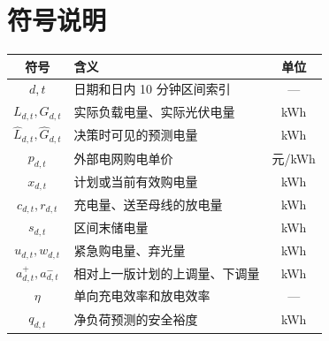 \section{符号说明}

\begin{center}
  \begin{tabular}{clc}
    \toprule
    \textbf{符号} & \textbf{含义} & \textbf{单位} \\
    \midrule
    $d,t$ & 日期和日内 10 分钟区间索引 & --- \\
    $L_{d,t},G_{d,t}$ & 实际负载电量、实际光伏电量 & kWh \\
    $\widehat L_{d,t},\widehat G_{d,t}$ & 决策时可见的预测电量 & kWh \\
    $p_{d,t}$ & 外部电网购电单价 & 元/kWh \\
    $x_{d,t}$ & 计划或当前有效购电量 & kWh \\
    $c_{d,t},r_{d,t}$ & 充电量、送至母线的放电量 & kWh \\
    $s_{d,t}$ & 区间末储电量 & kWh \\
    $u_{d,t},w_{d,t}$ & 紧急购电量、弃光量 & kWh \\
    $a^+_{d,t},a^-_{d,t}$ & 相对上一版计划的上调量、下调量 & kWh \\
    $\eta$ & 单向充电效率和放电效率 & --- \\
    $q_{d,t}$ & 净负荷预测的安全裕度 & kWh \\
    \bottomrule
  \end{tabular}
\end{center}
